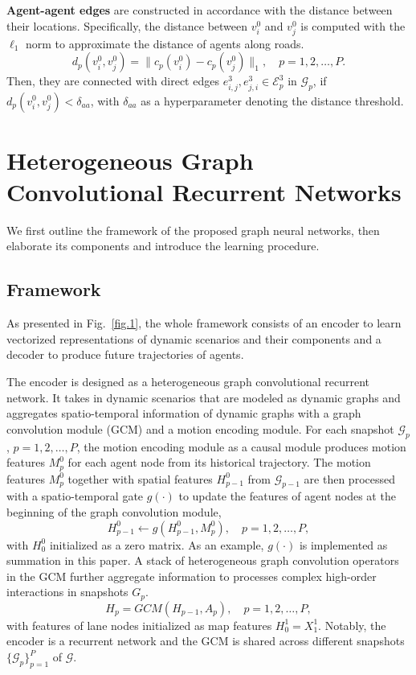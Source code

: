 \documentclass[letterpaper, 10 pt, conference]{ieeeconf}
\begin{document}
\textbf{Agent-agent edges} are constructed in accordance with the distance between their locations. Specifically, the distance between $v_i^0$ and  $v_j^0$ is computed with the $\ell_1$ norm to approximate the distance of agents along roads.
\begin{equation}
    d_p(v_i^0, v_j^0)= \|c_p(v_i^0)-c_p(v_j^0)\|_1, \quad p=1,2,\dots, P.
\end{equation}
Then, they are connected with direct edges $e_{i,j}^3, e_{j,i}^3 \in \mathcal{E}_p^3$  in $\mathcal{G}_p$,  if $d_p(v_i^0, v_j^0) < \delta_{aa}$, with $\delta_{aa}$ as a hyperparameter denoting the distance threshold.

\section{Heterogeneous Graph Convolutional Recurrent Networks}
We first outline the framework of the proposed graph neural networks,  then elaborate its components and introduce the learning procedure.
\subsection{Framework}
As presented in Fig.~\ref{fig.1}, the whole framework consists of an encoder to learn vectorized representations of dynamic scenarios and their components  and a decoder to produce future trajectories of agents.

The encoder is designed as a  heterogeneous graph convolutional recurrent network. It takes in dynamic scenarios that are modeled as dynamic graphs and aggregates spatio-temporal information of dynamic graphs with a graph convolution module (GCM) and a motion encoding module.  For each snapshot $\mathcal{G}_p$, $p=1, 2, \dots, P$, the motion encoding module as a causal module produces motion features  $M_p^0$ for each agent node  from its  historical trajectory. The motion features $M_p^0$ together with  spatial features $H_{p-1}^0$ from $\mathcal{G}_{p-1}$ are then processed with a spatio-temporal gate $g(\cdot)$ to update the features of agent nodes at the beginning of the graph convolution module,
\begin{equation}
    H_{p-1}^0 \leftarrow g(H_{p-1}^0, M_{p}^0), \quad p=1, 2, \dots, P,
\end{equation}
with $H_0^0$ initialized as a zero matrix. As an example, $g(\cdot)$ is implemented as summation in this paper.  A stack of heterogeneous graph convolution operators in the GCM further aggregate information to processes complex high-order interactions in  snapshots $G_p$.
\begin{equation}
    H_{p}=GCM(H_{p-1}, A_p),  \quad p=1,2,\dots,P,
\end{equation}
with features of lane nodes initialized as map features $H_0^1=X_1^1$. Notably, the encoder is a recurrent network and the GCM is shared across different snapshots $\{ \mathcal{G}_p\}_{p=1}^P$ of $\mathcal{G}$.
\end{document}
